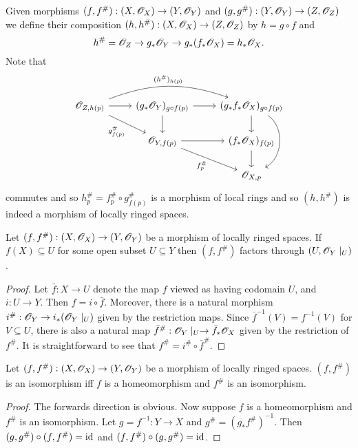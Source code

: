 \documentclass{memoir}
\begin{document}
Given morphisms $(f,f^\#):(X,\mathscr{O}_X)\to (Y,\mathscr{O}_Y)$ and $(g,g^\#):(Y,\mathscr{O}_Y)\to (Z,\mathscr{O}_Z)$ we define their composition $(h,h^\#):(X,\mathscr{O}_X)\to (Z,\mathscr{O}_Z)$ by $h = g\circ f$ and
\begin{equation}
    h^\# = \mathscr{O}_Z \to g_*\mathscr{O}_Y \to g_*(f_*\mathscr{O}_X) = h_*\mathscr{O}_X.
\end{equation}
Note that
\begin{equation}
    \begin{tikzcd}
        \shf{O}_{Z,h(p)} \arrow[r] \arrow[rr,bend left=20,"(h^\#)_{h(p)}"] \arrow[dr,swap,"g^\#_{f(p)}"] & (g_*\shf{O}_Y)_{g\circ f(p)} \arrow[r] \arrow[d] & (g_*f_*\shf{O}_X)_{g\circ f(p)} \arrow[d] \arrow[dd,bend left=60] \\
                                                            & \shf{O}_{Y,f(p)} \arrow[r] \arrow[dr,swap,"f^\#_p"] & (f_*\shf{O}_X)_{f(p)} \arrow[d] \\
                                   & & \shf{O}_{X,p}
    \end{tikzcd}
\end{equation}
commutes and so $h^\#_p = f^\#_p\circ g^\#_{f(p)}$ is a morphism of local rings and so $(h,h^\#)$ is indeed a morphism of locally ringed spaces.
\begin{proposition}
    \label{prop:factor}
    Let $(f,f^\#):(X,\mathscr{O}_X)\to (Y,\mathscr{O}_Y)$ be a morphism of locally ringed spaces.
    If $f(X)\subseteq U$ for some open subset $U\subseteq Y$ then $(f,f^\#)$ factors through $(U,\mathscr{O}_Y\mid_U)$.
\end{proposition}
\begin{proof}
    Let $\bar f:X\to U$ denote the map $f$ viewed as having codomain $U$, and $i:U\to Y$.
    Then $f = i\circ \bar f$.
    Moreover, there is a natural morphism $i^\#:\mathscr{O}_Y\to i_*(\mathscr{O}_Y\mid_U)$ given by the restriction maps.
    Since $\bar f^{-1}(V) = f^{-1}(V)$ for $V\subseteq U$, there is also a natural map $\bar f^\#:\mathscr{O}_Y\mid_U \to \bar f_*\mathscr{O}_X$ given by the restriction of $f^\#$.
    It is straightforward to see that $f^\# = i^\#\circ \bar f^\#$.
\end{proof}
\begin{thm}
    Let $(f,f^\#):(X,\mathscr{O}_X)\to (Y,\mathscr{O}_Y)$ be a morphism of locally ringed spaces.
    $(f,f^\#)$ is an isomorphism iff $f$ is a homeomorphism and $f^\#$ is an isomorphism.
\end{thm}
\begin{proof}
    The forwards direction is obvious.
    Now suppose $f$ is a homeomorphism and $f^\#$ is an isomorphism.
    Let $g = f^{-1}:Y\to X$ and $g^\# = (g_*f^\#)^{-1}$.
    Then $(g,g^\#) \circ (f,f^\#) = \operatorname{id}$ and $(f,f^\#) \circ (g,g^\#) = \operatorname{id}$.
\end{proof}
\end{document}
